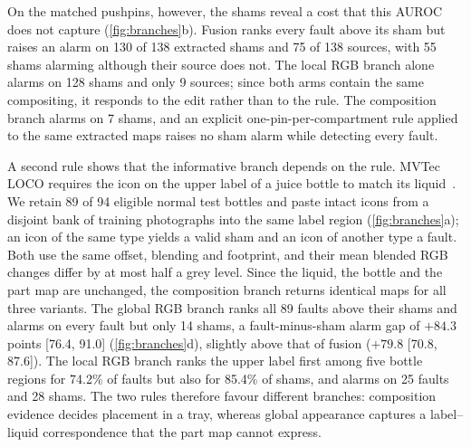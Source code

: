 On the matched pushpins, however, the shams reveal a cost that this AUROC does not capture (\cref{fig:branches}b). Fusion ranks every fault above its sham but raises an alarm on 130 of 138 extracted shams and 75 of 138 sources, with 55 shams alarming although their source does not. The local RGB branch alone alarms on 128 shams and only 9 sources; since both arms contain the same compositing, it responds to the edit rather than to the rule. The composition branch alarms on 7 shams, and an explicit one-pin-per-compartment rule applied to the same extracted maps raises no sham alarm while detecting every fault.

A second rule shows that the informative branch depends on the rule. MVTec LOCO requires the icon on the upper label of a juice bottle to match its liquid~\cite{bergmann2022}. We retain 89 of 94 eligible normal test bottles and paste intact icons from a disjoint bank of training photographs into the same label region (\cref{fig:branches}a); an icon of the same type yields a valid sham and an icon of another type a fault. Both use the same offset, blending and footprint, and their mean blended RGB changes differ by at most half a grey level. Since the liquid, the bottle and the part map are unchanged, the composition branch returns identical maps for all three variants. The global RGB branch ranks all 89 faults above their shams and alarms on every fault but only 14 shams, a fault-minus-sham alarm gap of $+84.3$ points [76.4, 91.0] (\cref{fig:branches}d), slightly above that of fusion ($+79.8$ [70.8, 87.6]). The local RGB branch ranks the upper label first among five bottle regions for 74.2\% of faults but also for 85.4\% of shams, and alarms on 25 faults and 28 shams. The two rules therefore favour different branches: composition evidence decides placement in a tray, whereas global appearance captures a label--liquid correspondence that the part map cannot express.

